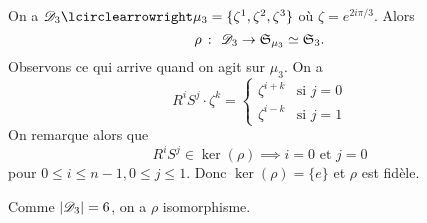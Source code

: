 {\begin{td-sol}
        
        On a \(\scr D_3\act \mu_3 = \{\zeta^1,\zeta^2,\zeta^3\}\) où \(\zeta = e^{2i\pi/3}\). Alors
        \begin{equation*}
            \rho\ \colon\  \mathscr{D}_3 \to \mathfrak{S}_{\mu_3} \simeq \mathfrak{S}_3.
        \end{equation*}
        Observons ce qui arrive quand on agit sur \(\mu_3\). On a
        \begin{equation*}
            R^i S^j \cdot \zeta^k =
            \begin{cases}
                \zeta^{i+k} &\text{si } j = 0\\
                \zeta^{i-k} &\text{si } j = 1
            \end{cases}
        \end{equation*}
        On remarque alors que
        \begin{equation*}
            R^i S^j \in\ker(\rho)
            \implies i = 0 \text{ et } j = 0
        \end{equation*}
        pour \(0 \leq i \leq n-1, 0 \leq j \leq 1\). Donc \(\ker(\rho) = \{e\}\) et \(\rho\) est fidèle.

        Comme \(\mathopen{}\left|\mathscr{D}_3\right|\mathclose{} = 6\), on a \(\rho\) isomorphisme.
    \end{td-sol}
}{}

